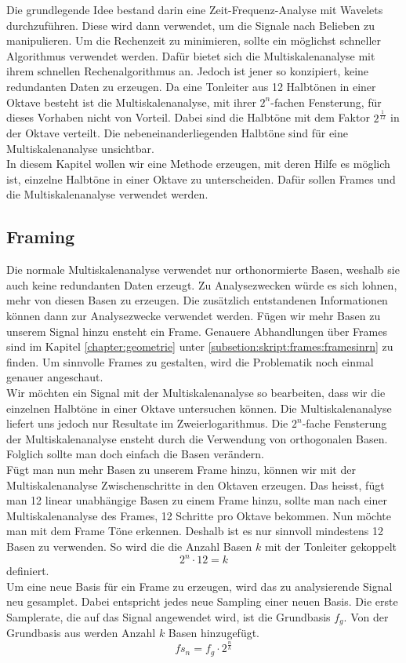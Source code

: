 



Die grundlegende Idee bestand darin eine Zeit-Frequenz-Analyse mit Wavelets durchzuführen. Diese wird dann verwendet, um die Signale nach Belieben zu manipulieren. Um die Rechenzeit zu minimieren, sollte ein möglichst schneller Algorithmus verwendet werden. Dafür bietet sich die Multiskalenanalyse mit ihrem schnellen Rechenalgorithmus an. Jedoch ist jener so konzipiert, keine redundanten Daten zu erzeugen. Da eine Tonleiter aus 12 Halbtönen in einer Oktave besteht ist die Multiskalenanalyse, mit ihrer $2^{n}$-fachen Fensterung, für dieses Vorhaben nicht von Vorteil. Dabei sind die Halbtöne mit dem Faktor $2^{\frac{1}{12}}$ in der Oktave verteilt. Die nebeneinanderliegenden Halbtöne sind für eine Multiskalenanalyse unsichtbar. \\
In diesem Kapitel wollen wir eine Methode erzeugen, mit deren Hilfe es möglich ist, einzelne Halbtöne in einer Oktave zu unterscheiden. Dafür sollen Frames und die Multiskalenanalyse verwendet werden.




\subsection{Framing}

Die normale Multiskalenanalyse verwendet nur orthonormierte Basen, weshalb sie auch keine redundanten Daten erzeugt. Zu Analysezwecken würde es sich lohnen, mehr von diesen Basen zu erzeugen. Die zusätzlich entstandenen Informationen können dann zur Analysezwecke verwendet werden. Fügen wir mehr Basen zu unserem Signal hinzu ensteht ein Frame. Genauere Abhandlungen über Frames sind im Kapitel \ref{chapter:geometrie} unter \ref{subsetion:skript:frames:framesinrn} zu finden. Um sinnvolle Frames zu gestalten, wird die Problematik noch einmal genauer angeschaut.\\

Wir möchten ein Signal mit der Multiskalenanalyse so bearbeiten, dass wir die einzelnen Halbtöne in einer Oktave untersuchen können. Die Multiskalenanalyse liefert uns jedoch nur Resultate im Zweierlogarithmus. Die $2^{n}$-fache Fensterung der Multiskalenanalyse ensteht durch die Verwendung von orthogonalen Basen. Folglich sollte man doch einfach die Basen verändern.\\

Fügt man nun mehr Basen zu unserem Frame hinzu, können wir mit der Multiskalenanalyse Zwischenschritte in den Oktaven erzeugen. Das heisst, fügt man 12 linear unabhängige Basen zu einem Frame hinzu, sollte man nach einer Multiskalenanalyse des Frames, 12 Schritte pro Oktave bekommen. Nun möchte man mit dem Frame Töne erkennen. Deshalb ist es nur sinnvoll mindestens 12 Basen zu verwenden. So wird die die Anzahl Basen $k$ mit der Tonleiter gekoppelt
\[ 2^{n} \cdot 12 = k \]
definiert.\\
Um eine neue Basis für ein Frame zu erzeugen, wird das zu analysierende Signal neu gesamplet. Dabei entspricht jedes neue Sampling einer neuen Basis. Die erste Samplerate, die auf das Signal angewendet wird, ist die Grundbasis $f_{g}$. Von der Grundbasis aus werden Anzahl $k$ Basen hinzugefügt.
\[fs_{n}=f_{g}\cdot2^{\frac{n}{k}}\]

